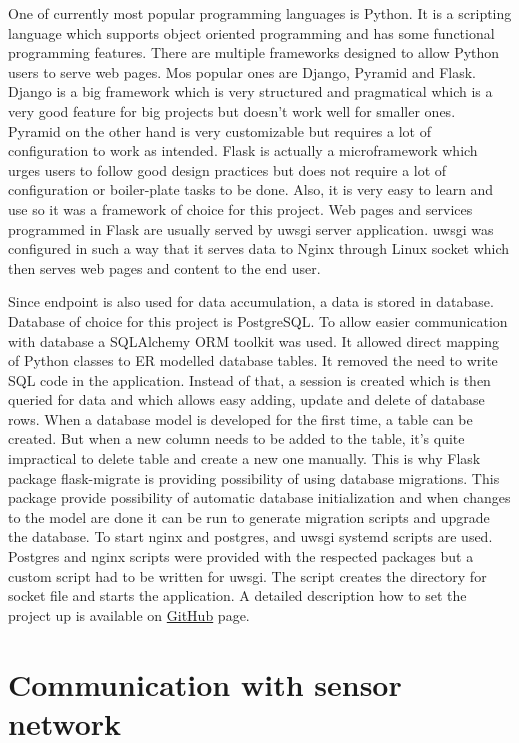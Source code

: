 One of currently most popular programming languages is Python. It is a scripting language which supports object oriented programming and has some functional programming features. There are multiple frameworks designed to allow Python users to serve web pages. Mos popular ones are Django, Pyramid and Flask. Django is a big framework which is very structured and pragmatical which is a very good feature for big projects but doesn't work well for smaller ones. Pyramid on the other hand is very customizable but requires a lot of configuration to work as intended. Flask is actually a microframework which urges users to follow good design practices but does not require a lot of configuration or boiler-plate tasks to be done. Also, it is very easy to learn and use so it was a framework of choice for this project\cite{flask}. Web pages and services programmed in Flask are usually served by uwsgi server application. uwsgi was configured in such a way that it serves data to Nginx through Linux socket which then serves web pages and content to the end user.

Since endpoint is also used for data accumulation, a data is stored in database. Database of choice for this project is PostgreSQL\cite{postgres}. To allow easier communication with database a SQLAlchemy \ac{ORM} toolkit was used. It allowed direct mapping of Python classes to ER modelled database tables. It removed the need to write SQL code in the application. Instead of that, a session is created which is then queried for data and which allows easy adding, update and delete of database rows. When a database model is developed for the first time, a table can be created. But when a new column needs to be added to the table, it's quite impractical to delete table and create a new one manually. This is why Flask package flask-migrate is providing possibility of using database migrations. This package provide possibility of automatic database initialization and when changes to the model are done it can be run to generate migration scripts and upgrade the database. To start nginx and postgres, and uwsgi systemd scripts are used. Postgres and nginx scripts were provided with the respected packages but a custom script had to be written for uwsgi. The script creates the directory for socket file and starts the application. A detailed description how to set the project up is available on \href{github.com/Xenosb/thesis-edison}{GitHub} page.


\section{Communication with sensor network}

